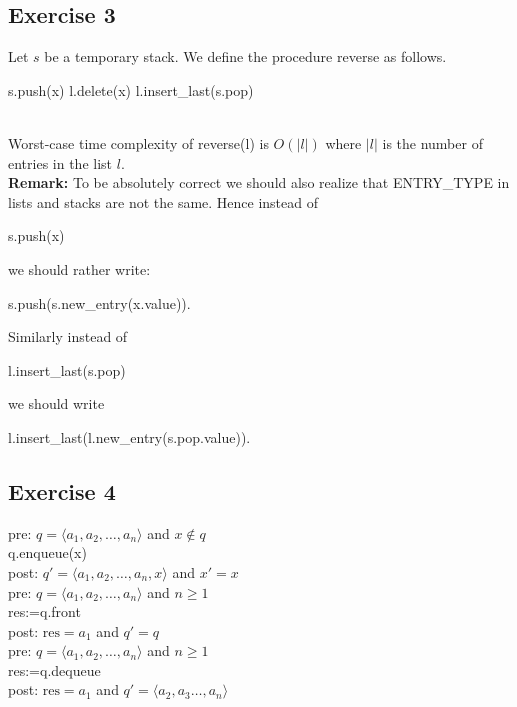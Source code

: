 \documentclass[english]{article}
\begin{document}
\subsection*{Exercise 3} 
Let $s$ be a temporary stack. We define the procedure reverse
as follows. \\

\begin{algorithmic}
\STATE s.push(x)
\STATE l.delete(x)
\ENDWHILE
{} 
\STATE l.insert\_last(s.pop)
\ENDWHILE
\end{algorithmic}
\mbox{} \\
Worst-case time complexity of reverse(l) is $O(|l|)$ where
$|l|$ is the number of entries in the list $l$.  \\[3mm]
{\bf Remark:} To be absolutely correct we should also realize
that ENTRY\_TYPE in lists and stacks are not the same. Hence
instead of 

\centerline{s.push(x)}

we should rather write:

\centerline{s.push(s.new\_entry(x.value)).}

Similarly instead of

\centerline{l.insert\_last(s.pop)}

we should write

\centerline{l.insert\_last(l.new\_entry(s.pop.value)).}


\subsection*{Exercise 4}

pre: $q=\langle a_1, a_2, \ldots, a_n\rangle$ and $x \not\in q$ \\[2mm]
\mbox{} \hspace{5mm} q.enqueue(x) \\[2mm]
post: $q'=\langle a_1, a_2, \ldots, a_n, x\rangle$ and $x'=x$ \\[6mm]
pre: $q=\langle a_1, a_2, \ldots, a_n\rangle$ and $n \geq 1$\\[2mm]
\mbox{} \hspace{5mm} res:=q.front \\[2mm]
post: $\mbox{res}=a_1$ and $q'=q$ \\[6mm]
pre: $q=\langle a_1, a_2, \ldots, a_n\rangle$ and $n\geq 1$ \\[2mm]
\mbox{} \hspace{5mm} res:=q.dequeue \\[2mm]
post: $\mbox{res}=a_1$ and $q'=\langle a_2, a_3\ldots, a_n\rangle$ 
\end{document}
